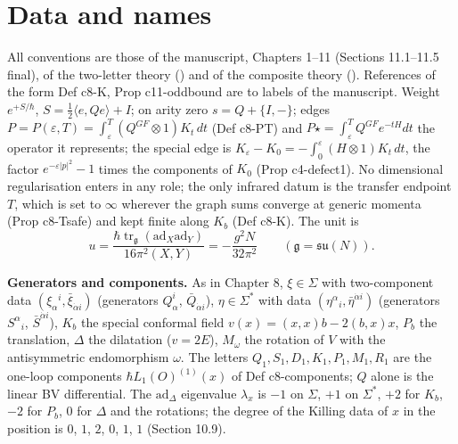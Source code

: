 \documentclass[11pt]{article}
\numberwithin{equation}{section}
\theoremstyle{plain}
\theoremstyle{definition}
\begin{document}
\tableofcontents


\section{Data and names}
\label{sec:qs-data}

All conventions are those of the manuscript, Chapters 1--11 (Sections 11.1--11.5 final), of the two-letter theory () and of the composite theory (). References of the form Def c8-K, Prop c11-oddbound are to labels of the manuscript. Weight $e^{+S/\hbar}$, $S=\tfrac12\langle e,Qe\rangle+I$; on arity zero $s=Q+\{I,-\}$; edges $P=P(\varepsilon,T)=\int_\varepsilon^T(Q^{GF}\otimes1)K_t\,dt$ (Def c8-PT) and $P\star=\int_\varepsilon^TQ^{GF}e^{-tH}dt$ the operator it represents; the special edge is $K_\varepsilon-K_0=-\int_0^\varepsilon(H\otimes1)K_t\,dt$, the factor $e^{-\varepsilon|p|^2}-1$ times the components of $K_0$ (Prop c4-defect1). No dimensional regularisation enters in any role; the only infrared datum is the transfer endpoint $T$, which is set to $\infty$ wherever the graph sums converge at generic momenta (Prop c8-Tsafe) and kept finite along $K_b$ (Def c8-K). The unit is
\[
u=\frac{\hbar\operatorname{tr}_{\mathfrak g}(\mathrm{ad}_X\mathrm{ad}_Y)}{16\pi^2(X,Y)}=-\frac{g^2N}{32\pi^2}\qquad(\mathfrak g=\mathfrak{su}(N)).
\]

\textbf{Generators and components.} As in Chapter 8, $\xi\in\Sigma$ with two-component data $(\xi_\alpha{}^i,\bar\xi_{\dot\alpha i})$ (generators $Q^i_\alpha$, $\bar Q_{\dot\alpha i}$), $\eta\in\Sigma^*$ with data $(\eta^\alpha{}_i,\bar\eta^{\dot\alpha i})$ (generators $S^\alpha{}_i$, $\bar S^{\dot\alpha i}$), $K_b$ the special conformal field $v(x)=(x,x)b-2(b,x)x$, $P_b$ the translation, $\Delta$ the dilatation ($v=2E$), $M_\omega$ the rotation of $V$ with the antisymmetric endomorphism $\omega$. The letters $Q_1,S_1,D_1,K_1,P_1,M_1,R_1$ are the one-loop components $\hbar L_1(O)^{(1)}(x)$ of Def c8-components; $Q$ alone is the linear BV differential. The $\mathrm{ad}_\Delta$ eigenvalue $\lambda_x$ is $-1$ on $\Sigma$, $+1$ on $\Sigma^*$, $+2$ for $K_b$, $-2$ for $P_b$, $0$ for $\Delta$ and the rotations; the degree of the Killing data of $x$ in the position is $0$, $1$, $2$, $0$, $1$, $1$ (Section 10.9).
\end{document}
